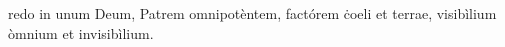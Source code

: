 redo in unum Deum, Patrem omnipotèntem, factórem ċoeli et terrae, visibìlium òmnium et invisibìlium.
